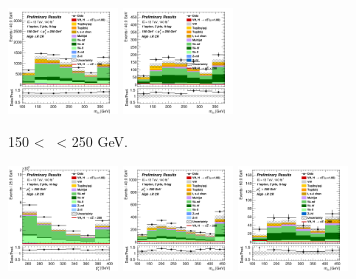 \begin{figure}[h!]
\begin{subfigure}[b]{\textwidth}
        \includegraphics[width=0.32\textwidth]{Images/VH/Own_fit/prefit_VHcc/Region_distmBB_BMax250_BMin150_DCRHigh_J2_TTypelt_T2_L1_Y6051_Prefit.png}
        \includegraphics[width=0.32\textwidth]{Images/VH/Own_fit/prefit_VHcc/Region_distmBB_BMax250_BMin150_DCRHigh_J2_TTypett_T2_L1_Y6051_Prefit.png}
        \caption{150 < \ptv\ < 250 GeV.}
        \label{fig:plots_VHcc_1L_150_CRH_2J}
    \end{subfigure}
    \begin{subfigure}[b]{\textwidth}
        \centering
        \includegraphics[width=0.32\textwidth]{Images/VH/Own_fit/prefit_VHcc/Region_distpTV_BMin250_DCRHigh_J2_TTypent_T1_L1_Y6051_Prefit.png}
        \includegraphics[width=0.32\textwidth]{Images/VH/Own_fit/prefit_VHcc/Region_distmBB_BMin250_DCRHigh_J2_TTypelt_T2_L1_Y6051_Prefit.png}
        \includegraphics[width=0.32\textwidth]{Images/VH/Own_fit/prefit_VHcc/Region_distmBB_BMin250_DCRHigh_J2_TTypett_T2_L1_Y6051_Prefit.png}

\end{subfigure}
\end{figure}
